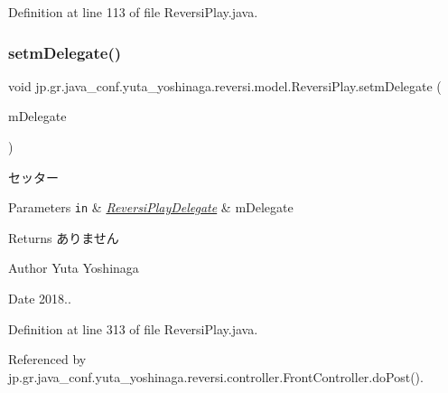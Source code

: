 Definition at line 113 of file Reversi\+Play.\+java.

\mbox{\label{classjp_1_1gr_1_1java__conf_1_1yuta__yoshinaga_1_1reversi_1_1model_1_1_reversi_play_adcfa7bddbb634a7408a9e85fe757bda3}} 
\subsubsection{\texorpdfstring{setm\+Delegate()}{setmDelegate()}}
{\footnotesize\ttfamily void jp.\+gr.\+java\+\_\+conf.\+yuta\+\_\+yoshinaga.\+reversi.\+model.\+Reversi\+Play.\+setm\+Delegate (\begin{DoxyParamCaption}\item[{\hyperlink{classjp_1_1gr_1_1java__conf_1_1yuta__yoshinaga_1_1reversi_1_1model_1_1_reversi_play_delegate}{Reversi\+Play\+Delegate}}]{m\+Delegate }\end{DoxyParamCaption})}



セッター 


\begin{DoxyParams}[1]{Parameters}
\mbox{\tt in}  & {\em \hyperlink{classjp_1_1gr_1_1java__conf_1_1yuta__yoshinaga_1_1reversi_1_1model_1_1_reversi_play_delegate}{Reversi\+Play\+Delegate}} & m\+Delegate \\
\hline
\end{DoxyParams}
\begin{DoxyReturn}{Returns}
ありません 
\end{DoxyReturn}
\begin{DoxyAuthor}{Author}
Yuta Yoshinaga 
\end{DoxyAuthor}
\begin{DoxyDate}{Date}
2018.. 
\end{DoxyDate}


Definition at line 313 of file Reversi\+Play.\+java.



Referenced by jp.\+gr.\+java\+\_\+conf.\+yuta\+\_\+yoshinaga.\+reversi.\+controller.\+Front\+Controller.\+do\+Post().

